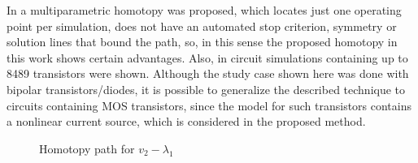 \documentclass[conference,letterpaper,twocolumn]{IEEEtran}
\begin{document}
In \cite{homo_MOS} a multiparametric homotopy was proposed, which locates just one operating point per simulation, does not have an automated stop criterion, symmetry or solution lines that bound the path, so, in this sense the proposed homotopy in this work shows certain advantages. Also, in \cite{homo_MOS} circuit simulations containing up to 8489 transistors were shown. Although the study case shown here was done with bipolar transistors/diodes, it is possible to generalize the described technique to circuits containing MOS transistors, since the model for such transistors contains a nonlinear current source, which is considered in the proposed method.

\begin{figure}[hbtp]
\centerline{
\epsfxsize=105mm
}
\caption{Homotopy path for $v_2-\lambda_1$}
\label{yamaie}
\end{figure}

\begin{table}[htbp]
{\small
{}
}
\caption{Extreme points for three homotopy paths, considering $\lambda_1=0.5$ and $\lambda_2=0$.}
\label{yamamuracircuitosoluc}
\end{table}
\end{document}
